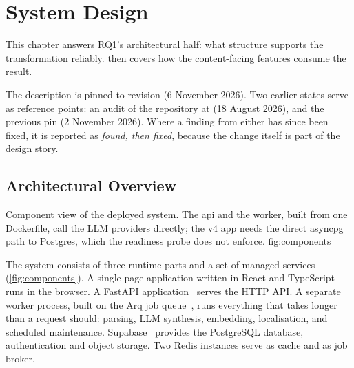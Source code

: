\chapter{System Design}
\label{ch:design}

This chapter answers RQ1's architectural half: what structure supports the
transformation reliably.  then covers how the
content-facing features consume the result.

The description is pinned to revision \code{\thesisCommit} (6 November 2026).
Two earlier states serve as reference points: an audit of the repository at
\code{\thesisEarlierCommit} (18 August 2026), and the previous pin
\code{\thesisPreviousCommit} (2 November 2026). Where a finding from either has
since been fixed, it is reported as \emph{found, then fixed}, because the change
itself is part of the design story.

\section{Architectural Overview}
\label{sec:architecture}

  {Component view of the deployed system. The api and the worker, built from
   one Dockerfile, call the LLM providers directly; the v4 app needs the direct
   asyncpg path to Postgres, which the readiness probe does not enforce.}
  {fig:components}

The system consists of three runtime parts and a set of managed services
(\cref{fig:components}). A single-page application written in React and
TypeScript runs in the browser. A FastAPI application~\cite{fastapi} serves the
HTTP API. A separate worker process, built on the Arq job queue~\cite{arq}, runs
everything that takes longer than a request should: parsing, LLM synthesis,
embedding, localisation, and scheduled maintenance. Supabase~\cite{supabase}
provides the PostgreSQL database, authentication and object storage. Two Redis
instances serve as cache and as job broker.

